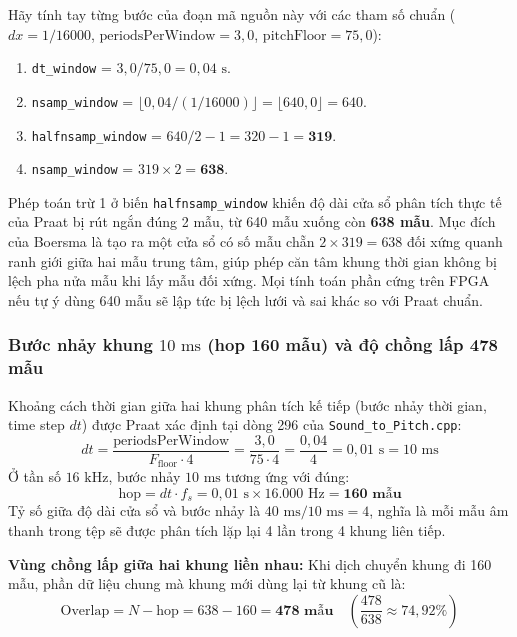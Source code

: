 Hãy tính tay từng bước của đoạn mã nguồn này với các tham số chuẩn ($dx = 1/16000$, $\text{periodsPerWindow} = 3{,}0$, $\text{pitchFloor} = 75{,}0$):
\begin{enumerate}[leftmargin=1.5em, itemsep=2pt]
    \item \texttt{dt\_window} = $3{,}0 / 75{,}0 = 0{,}04\text{ s}$.
    \item \texttt{nsamp\_window} = $\lfloor 0{,}04 / (1/16000) \rfloor = \lfloor 640{,}0 \rfloor = 640$.
    \item \texttt{halfnsamp\_window} = $640 / 2 - 1 = 320 - 1 = \mathbf{319}$.
    \item \texttt{nsamp\_window} = $319 \times 2 = \mathbf{638}$.
\end{enumerate}

Phép toán trừ 1 ở biến \texttt{halfnsamp\_window} khiến độ dài cửa sổ phân tích thực tế của Praat bị rút ngắn đúng 2 mẫu, từ 640 mẫu xuống còn \textbf{638 mẫu}. Mục đích của Boersma là tạo ra một cửa sổ có số mẫu chẵn $2 \times 319 = 638$ đối xứng quanh ranh giới giữa hai mẫu trung tâm, giúp phép căn tâm khung thời gian không bị lệch pha nửa mẫu khi lấy mẫu đối xứng. Mọi tính toán phần cứng trên FPGA nếu tự ý dùng 640 mẫu sẽ lập tức bị lệch lưới và sai khác so với Praat chuẩn.

\subsubsection*{Bước nhảy khung $10\text{ ms}$ (hop 160 mẫu) và độ chồng lấp 478 mẫu}
Khoảng cách thời gian giữa hai khung phân tích kế tiếp (bước nhảy thời gian, time step $dt$) được Praat xác định tại dòng 296 của \texttt{Sound\_to\_Pitch.cpp}:
\begin{equation}
dt = \frac{\text{periodsPerWindow}}{F_{\text{floor}} \cdot 4} = \frac{3{,}0}{75 \cdot 4} = \frac{0{,}04}{4} = 0{,}01\text{ s} = 10\text{ ms}
\end{equation}
Ở tần số $16\text{ kHz}$, bước nhảy $10\text{ ms}$ tương ứng với đúng:
\begin{equation}
\text{hop} = dt \cdot f_s = 0{,}01\text{ s} \times 16.000\text{ Hz} = \mathbf{160\text{ mẫu}}
\end{equation}
Tỷ số giữa độ dài cửa sổ và bước nhảy là $40\text{ ms} / 10\text{ ms} = 4$, nghĩa là mỗi mẫu âm thanh trong tệp sẽ được phân tích lặp lại 4 lần trong 4 khung liên tiếp.

\textbf{Vùng chồng lấp giữa hai khung liền nhau:}
Khi dịch chuyển khung đi 160 mẫu, phần dữ liệu chung mà khung mới dùng lại từ khung cũ là:
\begin{equation}
\text{Overlap} = N - \text{hop} = 638 - 160 = \mathbf{478\text{ mẫu}} \quad \left(\frac{478}{638} \approx 74{,}92\%\right)
\end{equation}

